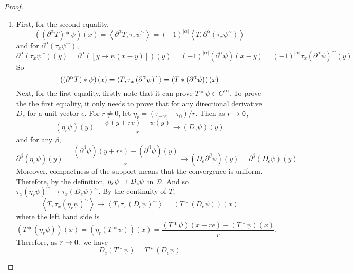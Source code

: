 \begin{enumerate}[label=\arabic*.]
\begin{proof}
\begin{enumerate}[label=(\arabic{*})]
			\item First, for the second equality,
			\begin{equation*}
				\left(\left(\partial^\alpha T\right) * \psi\right)(x)=\left\langle\partial^\alpha T, \tau_x \psi^{\sim}\right\rangle=(-1)^{|\alpha|}\left\langle T, \partial^\alpha\left(\tau_x \psi^{\sim}\right)\right\rangle
			\end{equation*}
			and for $\partial^\alpha\left(\tau_x \psi^{\sim}\right)$,
			\begin{equation*}
				\partial^\alpha\left(\tau_x \psi^{\sim}\right)(y)=\partial^\alpha([y \mapsto \psi(x-y)])(y)=(-1)^{|\alpha|}\left(\partial^\alpha \psi\right)(x-y)=(-1)^{|\alpha|} \tau_x\left(\partial^\alpha \psi\right)^{\sim}(y)
			\end{equation*}
			So
			\begin{equation*}
				\left(\left(\partial^\alpha T\right) * \psi\right)(x) = \left\langle T, \tau_x\left(\partial^\alpha \psi\right)^{\sim}\right\rangle = \left(T * (\partial^\alpha \psi)\right)(x)
			\end{equation*}
			Next, for the first equality, firstly note that it can prove $T*\psi \in C^\infty$. To prove the the first equality, it only needs to prove that for any directional derivative $D_e$ for a unit vector $e$. For $r \neq 0$, let $\eta_r=\left(\tau_{-r e}-\tau_0\right) / r$. Then as $r \rightarrow 0$,
			\begin{equation*}
					\left(\eta_r \psi\right)(y)=\frac{\psi(y+r e)-\psi(y)}{r} \rightarrow\left(D_e \psi\right)(y)
			\end{equation*}
			and for any $\beta$,
			\begin{equation*}
				\partial^\beta\left(\eta_r \psi\right)(y)=\frac{\left(\partial^\beta \psi\right)(y+r e)-\left(\partial^\beta \psi\right)(y)}{r} \rightarrow\left(D_e \partial^\beta \psi\right)(y)=\partial^\beta\left(D_e \psi\right)(y)
			\end{equation*}
			Moreover, compactness of the support means that the convergence is uniform. Therefore, by the definition, $\eta_r \psi \rightarrow D_e \psi$ in $\mathcal{D}$. And so $\tau_x\left(\eta_r \psi\right)^{\sim} \rightarrow \tau_x\left(D_e \psi\right)^{\sim}$. By the continuity of $T$,
			\begin{equation*}
				\left\langle T, \tau_x\left(\eta_r \psi\right)^{\sim}\right\rangle \rightarrow\left\langle T, \tau_x\left(D_e \psi\right)^{\sim}\right\rangle=\left(T *\left(D_e \psi\right)\right)(x)
			\end{equation*}
			where the left hand side is
			\begin{equation*}
				\left(T *\left(\eta_r \psi\right)\right)(x)=\left(\eta_r(T * \psi)\right)(x)=\frac{(T * \psi)(x+r e)-(T * \psi)(x)}{r} .
			\end{equation*}
			Therefore, as $r \rightarrow 0$, we have
			\begin{equation*}
				D_e(T * \psi)=T *\left(D_e \psi\right)
			\end{equation*}
		\end{enumerate}
	\end{proof}
	

\end{enumerate}

